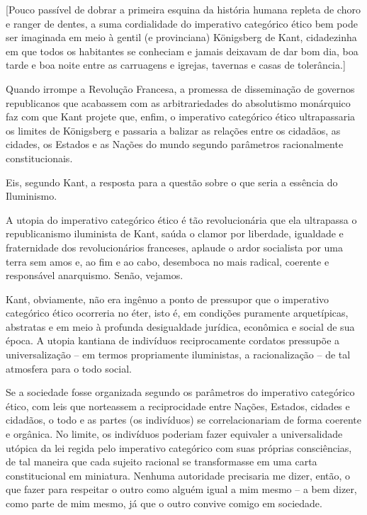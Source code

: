 {[}Pouco passível de dobrar a primeira esquina da história humana
repleta de choro e ranger de dentes, a suma cordialidade do imperativo
categórico ético bem pode ser imaginada em meio à gentil (e provinciana)
Königsberg de Kant, cidadezinha em que todos os habitantes se conheciam
e jamais deixavam de dar bom dia, boa tarde e boa noite entre as
carruagens e igrejas, tavernas e casas de tolerância.{]}

Quando irrompe a Revolução Francesa, a promessa de disseminação de
governos republicanos que acabassem com as arbitrariedades do
absolutismo monárquico faz com que Kant projete que, enfim, o imperativo
categórico ético ultrapassaria os limites de Königsberg e passaria a
balizar as relações entre os cidadãos, as cidades, os Estados e as
Nações do mundo segundo parâmetros racionalmente constitucionais.

Eis, segundo Kant, a resposta para a questão sobre o que seria a
essência do Iluminismo.

A utopia do imperativo categórico ético é tão revolucionária que ela
ultrapassa o republicanismo iluminista de Kant, saúda o clamor por
liberdade, igualdade e fraternidade dos revolucionários franceses,
aplaude o ardor socialista por uma terra sem amos e, ao fim e ao cabo,
desemboca no mais radical, coerente e responsável anarquismo. Senão,
vejamos.

Kant, obviamente, não era ingênuo a ponto de pressupor que o imperativo
categórico ético ocorreria no éter, isto é, em condições puramente
arquetípicas, abstratas e em meio à profunda desigualdade jurídica,
econômica e social de sua época. A utopia kantiana de indivíduos
reciprocamente cordatos pressupõe a universalização -- em termos
propriamente iluministas, a racionalização -- de tal atmosfera para o
todo social.

Se a sociedade fosse organizada segundo os parâmetros do imperativo
categórico ético, com leis que norteassem a reciprocidade entre Nações,
Estados, cidades e cidadãos, o todo e as partes (os indivíduos) se
correlacionariam de forma coerente e orgânica. No limite, os indivíduos
poderiam fazer equivaler a universalidade utópica da lei regida pelo
imperativo categórico com suas próprias consciências, de tal maneira que
cada sujeito racional se transformasse em uma carta constitucional em
miniatura. Nenhuma autoridade precisaria me dizer, então, o que fazer
para respeitar o outro como alguém igual a mim mesmo -- a bem dizer,
como parte de mim mesmo, já que o outro convive comigo em sociedade.

